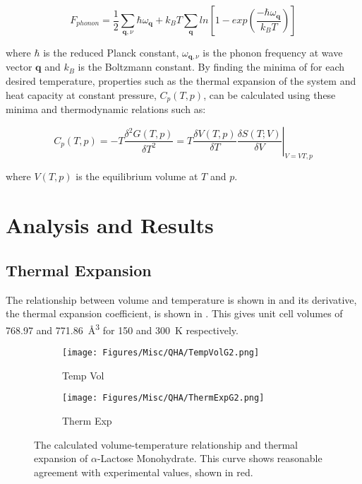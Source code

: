 \begin{equation}
F_{phonon} = \frac{1}{2} \sum_{\textbf{q},\nu} \hbar\omega_{\textbf{q}} + k_BT \sum_{\textbf{q}} ln[1 - exp({\frac{-\hbar \omega_{\textbf{q}}}{k_BT}})]
\end{equation}

where \(\hbar\) is the reduced Planck constant, \(\omega_{\textbf{q},\nu}\) is the phonon frequency at wave vector \(\textbf{q}\) and \(k_B\) is the Boltzmann constant. By finding the minima of  for each desired temperature, properties such as the thermal expansion of the system and heat capacity at constant pressure, \(C_p(T,p)\), can be calculated using these minima and thermodynamic relations such as:

\begin{equation}
C_p(T,p) = \left. -T\frac{\delta^2G(T,p)}{\delta T^2} = T\frac{\delta V(T,p)}{\delta T} \frac{\delta S(T;V)}{\delta V} \right\rvert_{V=V{T,p}}
\end{equation}

where \(V(T,p)\) is the equilibrium volume at \(T\) and \(p\).

\section{Analysis and Results}
\subsection{Thermal Expansion}
The relationship between volume and temperature is shown in  and its derivative, the thermal expansion coefficient, is shown in . This gives unit cell volumes of 768.97 and \SI{771.86}{\angstrom^3} for 150 and \SI{300}{K} respectively. 

\begin{figure}[ht]
\centering

\begin{subfigure}{0.49\textwidth}
\centering
\texttt{[image: Figures/Misc/QHA/TempVolG2.png]}
\caption{Temp Vol}
\label{fig:tempvol}
\end{subfigure}
\begin{subfigure}{0.49\textwidth}
\centering
\texttt{[image: Figures/Misc/QHA/ThermExpG2.png]}
\caption{Therm Exp}
\label{fig:thermexp}
\end{subfigure}

\captionsetup{font = footnotesize, justification = centering}
\caption[The Calculated Volume-Temperature Relationship and Thermal Expansion of \(\alpha\)-Lactose Monohydrate]{The calculated volume-temperature relationship and thermal expansion of \(\alpha\)-Lactose Monohydrate. This curve shows reasonable agreement with experimental values, shown in red.}
\label{Fig:tempvol+thermext}
\end{figure}

